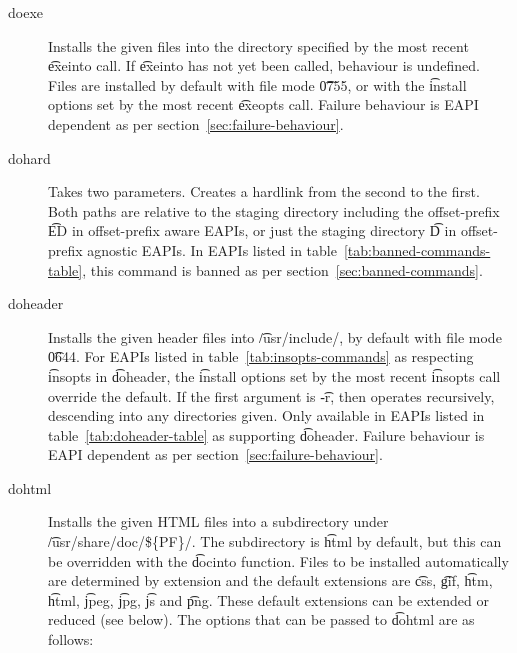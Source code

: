 \begin{description}
\item[doexe] Installs the given files into the directory specified by the most recent \t{exeinto}
    call. If \t{exeinto} has not yet been called, behaviour is undefined. Files are installed by
    default with file mode \t{0755}, or with the \t{install} options set by the most recent
    \t{exeopts} call.
    Failure behaviour is EAPI dependent as per section~\ref{sec:failure-behaviour}.

\item[dohard] Takes two parameters. Creates a hardlink from the second to the first. Both paths are
    relative to the staging directory including the offset-prefix \t{ED} in offset-prefix aware
    EAPIs, or just the staging directory \t{D} in offset-prefix agnostic EAPIs. In EAPIs listed
    in table~\ref{tab:banned-commands-table}, this command is banned as per
    section~\ref{sec:banned-commands}.

\item[doheader]  Installs the given header files into \t{/usr/include/},
    by default with file mode \t{0644}. For EAPIs listed in table~\ref{tab:insopts-commands}
    as respecting \t{insopts} in \t{doheader}, the \t{install} options set by the most recent
    \t{insopts} call override the default. If the first argument is \t{-r}, then operates
    recursively, descending into any directories given.
    Only available in EAPIs listed in table~\ref{tab:doheader-table} as supporting \t{doheader}.
    Failure behaviour is EAPI dependent as per section~\ref{sec:failure-behaviour}.

\item[dohtml] Installs the given HTML files into a subdirectory under \t{/usr/share/doc/\$\{PF\}/}.
    The subdirectory is \t{html} by default, but this can be overridden with the \t{docinto}
    function. Files to be installed automatically are determined by extension and the default
    extensions are \t{css}, \t{gif}, \t{htm}, \t{html}, \t{jpeg}, \t{jpg}, \t{js} and \t{png}.
    These default extensions can be extended or reduced (see below). The options that can be passed
    to \t{dohtml} are as follows:


\end{description}
